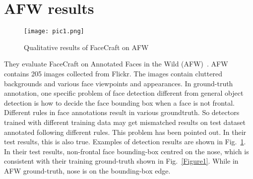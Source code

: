 \documentclass[10pt,twocolumn,letterpaper]{article}
\begin{document}
\section{AFW results}
\begin{figure}[!htb]
 \centering
 \texttt{[image: pic1.png]}\\
 \caption{Qualitative results of FaceCraft on AFW}\label{Figure2}
 \end{figure}
They evaluate FaceCraft on Annotated Faces in the Wild (AFW)~\cite{name39}. AFW contains 205 images collected from Flickr. The images contain cluttered backgrounds and various face viewpoints and appearances. In ground-truth annotation, one specific problem of face detection different from general object detection is how to decide the face bounding box when a face is not frontal. Different rules in face annotations result in various groundtruth. So detectors trained with different training data may get mismatched results on test dataset annotated following different rules. This problem has been pointed out. In their test results, this is also true. Examples of detection results are shown in Fig.~\ref{Figure2}. In their test results, non-frontal face bounding-box centred on the nose, which is consistent with their training ground-truth shown in Fig.~\ref{Figure1}. While in AFW ground-truth, nose is on the bounding-box edge.


\end{document}
